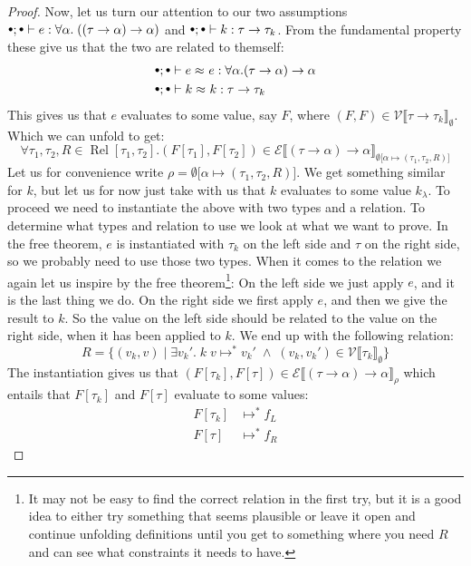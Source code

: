 \documentclass[a4paper,10pt,fleqn]{article}
\newcommand{\sem}[1]{\ensuremath{\llbracket #1 \rrbracket}}
\newcommand{\curly}[1]{\ensuremath{\mathcal{#1}}}
\DeclareMathOperator{\Rel}{Rel}
\newcommand{\evalto}{\ensuremath{\mapsto}}
\newcommand{\evaltos}[1][*]{\ensuremath{\evalto^{#1}}}
\newcommand{\mtenv}{{\raisebox{1.5pt}{$\scriptstyle\bullet$}}}
\newcommand{\vbar}{\ensuremath{\; | \;}}
\newcommand{\tarrow}[2]{\ensuremath{ #1 \rightarrow #2}}
\newcommand{\pand}{\ensuremath{\; \wedge \;}}
\newcommand{\equivalence}[3]{\ensuremath{#1 \approx^{#2} #3}}
\newcommand{\lreq}[2]{\equivalence{#1}{ }{#2}}
\newcommand{\prep}[3]{\ensuremath{\curly{#1}\sem{#3}_{#2}}}
\newcommand{\eprep}[2][\rho]{\prep{E}{#1}{#2}}
\newcommand{\vprep}[2][\rho]{\prep{V}{#1}{#2}}
\newcommand{\extsub}[3]{\ensuremath{#1 \lbrack #2 \mapsto #3 \rbrack}}
\begin{document}
\begin{proof}
Now, let us turn our attention to our two assumptions $\mtenv; \mtenv \vdash e : \forall \alpha. \; (\tarrow{(\tarrow{\tau}{\alpha})}{\alpha})$ and $\mtenv; \mtenv \vdash k : \tarrow{\tau}{\tau_k}$. From the fundamental property these give us that the two are related to themself:
\newcommand{\ataa}{\ensuremath{\forall \alpha. \tarrow{(\tarrow{\tau}{\alpha})}{\alpha}}}
\newcommand{\ttk}{\ensuremath{\tarrow{\tau}{\tau_k}}}
\begin{align*}
  & \mtenv ; \mtenv \vdash \lreq{e}{e} : \ataa \\
  & \mtenv ; \mtenv \vdash \lreq{k}{k} : \ttk
\end{align*}
This gives us that $e$ evaluates to some value, say $F$, where $(F,F) \in \vprep[\emptyset]{\ttk}$. Which we can unfold to get:
\newcommand{\taa}{\ensuremath{\tarrow{(\tarrow{\tau}{\alpha})}{\alpha}}}
\[
 \forall \tau_1,\tau_2,R\in \Rel[\tau_1,\tau_2]. (F[\tau_1],F[\tau_2]) \in \eprep[\extsub{\emptyset}{\alpha}{(\tau_1,\tau_2,R)}]{\taa}
\]
Let us for convenience write $\rho=\extsub{\emptyset}{\alpha}{(\tau_1,\tau_2,R)}$. We get something similar for $k$, but let us for now just take with us that $k$ evaluates to some value $k_\lambda$. To proceed we need to instantiate the above with two types and a relation. To determine what types and relation to use we look at what we want to prove. In the free theorem,  $e$ is instantiated with $\tau_k$ on the left side and $\tau$ on the right side, so we probably need to use those two types. When it comes to the relation we again let us inspire by the free theorem\footnote{It may not be easy to find the correct relation in the first try, but it is a good idea to either try something that seems plausible or leave it open and continue unfolding definitions until you get to something where you need $R$ and can see what constraints it needs to have.}:
On the left side we just apply $e$, and it is the last thing we do. On the right side we first apply $e$, and then we give the result to $k$. So the value on the left side should be related to the value on the right side, when it has been applied to $k$. We end up with the following relation: 
\[
  R = \{(v_k,v) \vbar \exists v_k'. \; k \; v \evaltos v_k' \pand (v_k,v_k') \in \vprep[\emptyset]{\tau_k}\}
\]
The instantiation gives us that $(F[\tau_k],F[\tau]) \in \eprep[\rho]{\taa}$ which entails that $F[\tau_k]$ and $F[\tau]$ evaluate to some values:
\begin{align*}
  F[\tau_k] & \evaltos f_L \\
  F[\tau] & \evaltos f_R
\end{align*}

\end{proof}
\end{document}
